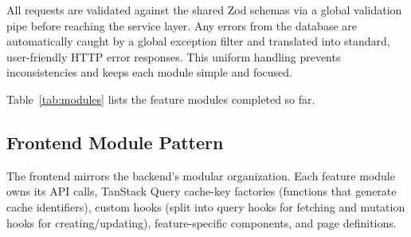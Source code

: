 All requests are validated against the shared Zod schemas via a global
validation pipe before reaching the service layer. Any errors from the database
are automatically caught by a global exception filter and translated into
standard, user-friendly HTTP error responses. This uniform handling prevents
inconsistencies and keeps each module simple and focused.

Table~\ref{tab:modules} lists the feature modules completed so far.

\begin{table}[ht]
	\centering
	\caption{Implemented backend feature modules.}
	\label{tab:modules}
\end{table}

\subsection{Frontend Module Pattern}
The frontend mirrors the backend's modular organization. Each feature module owns
its API calls, TanStack Query cache-key factories (functions that generate cache
identifiers), custom hooks (split into query hooks for fetching and mutation
hooks for creating/updating), feature-specific components, and page definitions.

